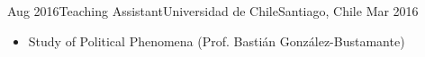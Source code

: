 \begin{experiences}
  \emptySeparator 
  \experience 
    {Aug 2016}{Teaching Assistant}{Universidad de Chile}{Santiago, Chile} {Mar 2016}
    {\begin{itemize}
    \item Study of Political Phenomena {\small (Prof. Bastián González-Bustamante)}
    \end{itemize}}
    {}
\end{experiences}
